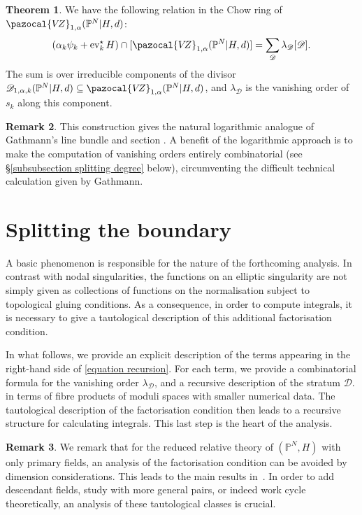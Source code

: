 \documentclass[11pt]{amsart}
\newcommand{\PP}{\mathbb P}
\newcommand{\VZ}{\pazocal{V\!Z}}
\newcommand{\st}{\star}
\newcommand{\ev}{\operatorname{ev}}
\newcommand{\Dcal}{\mathcal{D}}
\theoremstyle{definition}
\newtheorem{thm}{Theorem}[section]
\theoremstyle{definition}
\newtheorem{remark}[thm]{Remark}
\begin{document}
\begin{thm} \label{theorem recursion} We have the following relation in the Chow ring of $\VZ_{1,\alpha}(\PP^N|H,d)$:
\begin{equation}\label{equation recursion} (\alpha_k \psi_k + \ev_k^\st H) \cap [\VZ_{1,\alpha}(\PP^N|H,d)] = \sum_{\Dcal} \lambda_\Dcal [ \Dcal ].\end{equation}
The sum is over irreducible components of the divisor $\Dcal_{1,\alpha,k}(\PP^N|H,d) \subseteq \VZ_{1,\alpha}(\PP^N|H,d)$, and $\lambda_\Dcal$ is the vanishing order of $s_k$ along this component. \end{thm}

\begin{remark} This construction gives the natural logarithmic analogue of Gathmann's line bundle and section \cite[Construction 2.1]{Ga}. A benefit of the logarithmic approach is to make the computation of vanishing orders entirely combinatorial (see \S \ref{subsubsection splitting degree} below), circumventing the difficult technical calculation given by Gathmann. \end{remark}

\section{Splitting the boundary}\label{section reduced splitting}

A basic phenomenon is responsible for the nature of the forthcoming analysis. In contrast with nodal singularities, the functions on an elliptic singularity are not simply given as collections of functions on the normalisation subject to topological gluing conditions. As a consequence, in order to compute integrals, it is necessary to give a tautological description of this additional factorisation condition. 

In what follows, we provide an explicit description of the terms appearing in the right-hand side of \eqref{equation recursion}.  For each term, we provide a combinatorial formula for the vanishing order $\lambda_\Dcal$, and a recursive description of the stratum $\Dcal$. 
in terms of fibre products of moduli spaces with smaller numerical data. The tautological description of the factorisation condition then leads to a recursive structure for calculating integrals. This last step is the heart of the analysis. 

\begin{remark}
We remark that for the reduced relative theory of $(\mathbb P^N,H)$ with only primary fields, an analysis of the factorisation condition can be avoided by dimension considerations. This leads to the main results in~\cite{Vre}. In order to add descendant fields, study with more general pairs, or indeed work cycle theoretically, an analysis of these tautological classes is crucial. 
\end{remark}
\end{document}
